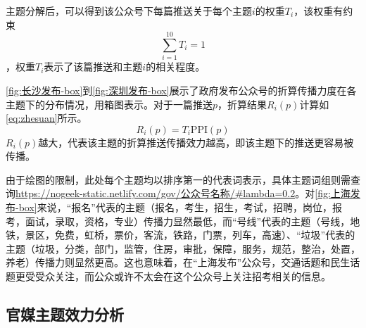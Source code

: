 \documentclass[a4paper,12pt,UTF8]{article}
\begin{document}
    主题分解后，可以得到该公众号下每篇推送关于每个主题$i$的权重$T_i$，该权重有约束$$\sum_{i=1}^{10}T_i=1$$，权重$T_i$表示了该篇推送和主题$i$的相关程度。

    \cref{fig:长沙发布-box}到\cref{fig:深圳发布-box}展示了政府发布公众号的折算传播力度在各主题下的分布情况，用箱图表示。对于一篇推送$p$，折算结果$R_i(p)$计算如\cref{eq:zhesuan}所示。
    \begin{equation}
      \label{eq:zhesuan}
      R_i(p) = T_i\text{PPI}(p)
    \end{equation}
    $R_i(p)$越大，代表该主题的折算推送传播效力越高，即该主题下的推送更容易被传播。
    
    由于绘图的限制，此处每个主题均以排序第一的代表词表示，具体主题词组则需查询\url{https://nogeek-static.netlify.com/gov/公众号名称/#lambda=0.2}。对\cref{fig:上海发布-box}来说，“报名”代表的主题（报名，考生，招生，考试，招聘，岗位，报考，面试，录取，资格，专业）传播力显然最低，而“号线”代表的主题（号线，地铁，景区，免费，虹桥，票价，客流，铁路，门票，列车，高速）、“垃圾”代表的主题（垃圾，分类，部门，监管，住房，审批，保障，服务，规范，整治，处置，养老）传播力则显然更高。这也意味着，在“上海发布”公众号，交通话题和民生话题更受受众关注，而公众或许不太会在这个公众号上关注招考相关的信息。

    \subsection{官媒主题效力分析}
    
    \label{applastpage}
    \newpage
    
    

\end{document}
